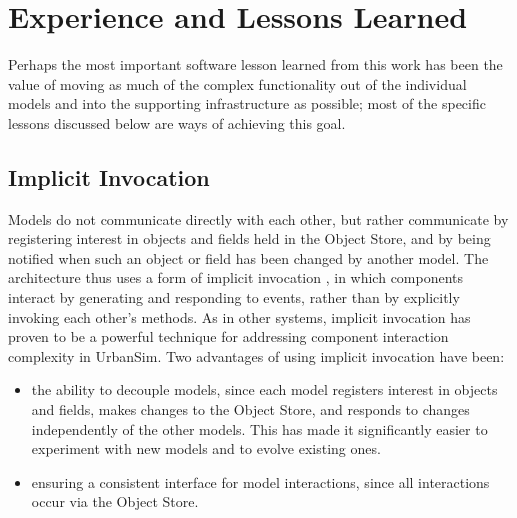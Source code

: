 
\section{Experience and Lessons Learned}
\label{sec:experience}


Perhaps the most important software lesson learned from this work has been
the value of moving as much of the complex functionality out of the
individual models and into the supporting infrastructure as possible; most
of the specific lessons discussed below are ways of achieving this goal.




\subsection{Implicit Invocation}
\label{sec:implicit-invocation}

Models do not communicate directly with each other, but rather communicate
by registering interest in objects and fields
held in the Object Store, and by being notified when such an object or field
has been changed by another model.  The architecture thus uses a form of
implicit invocation
\citep{garland-aske-1993,sullivan-tse-1992,sullivan-tse-1996},
in which components interact by generating and responding to events, rather
than by explicitly invoking each other's methods.  As in other systems,
implicit invocation has proven to be a powerful technique for addressing
component interaction complexity in UrbanSim.  Two advantages of using
implicit invocation have been:

\begin{itemize}

\item the ability to decouple models, since each model registers interest
in objects and fields, makes changes to the Object Store, and responds to
changes independently of the other models.  This has made it significantly
easier to experiment with new models and to evolve existing ones.

\item ensuring a consistent interface for model interactions, since
all interactions occur via the Object Store.

\end{itemize}

